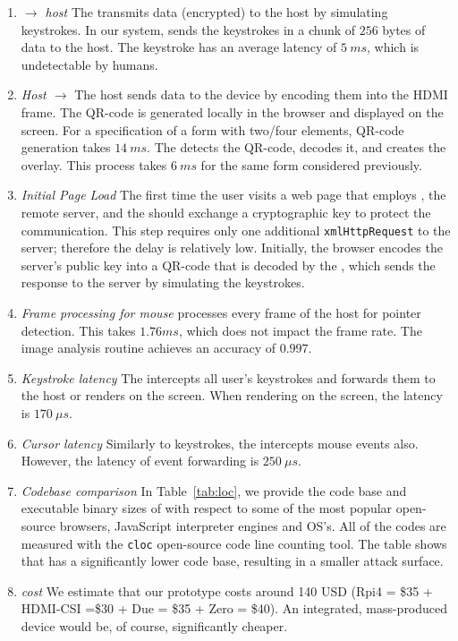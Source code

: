 \begin{enumerate}
  \item \emph{\device $\rightarrow$ host} The \device transmits data (encrypted) to the host by simulating keystrokes. In our system, \device sends the keystrokes in a chunk of $256$ bytes of data to the host. The keystroke has an average latency of $5\ ms$, which is undetectable by humans.  


\item \emph{Host $\rightarrow$ \device} The host sends data to the device by encoding them into the HDMI frame. The QR-code is generated locally in the browser and displayed on the screen. For a specification of a form with two/four elements, QR-code generation takes $14\ ms$. The \device detects the QR-code, decodes it, and creates the overlay. This process takes $6\ ms$ for the same form considered previously.
 
 \item \emph{Initial Page Load} The first time the user visits a web page that employs \name, the remote server, and the \device should exchange a cryptographic key to protect the communication. This step requires only one additional \texttt{xmlHttpRequest} to the server; therefore the delay is relatively low. Initially, the browser encodes the server's public key into a QR-code that is decoded by the \device, which sends the response to the server by simulating the keystrokes.


\item \emph{Frame processing for mouse} \device processes every frame of the host for pointer detection. This takes $1.76 ms$, which does not impact the frame rate. The image analysis routine achieves an accuracy of $0.997$. 


\item \emph{Keystroke latency} The \device intercepts all user's keystrokes and forwards them to the host or renders on the screen. When rendering on the screen, the latency is $170\ \mu s$.


\item \emph{Cursor latency} Similarly to keystrokes, the \device intercepts mouse events also. However, the latency of event forwarding is $250\ \mu s$.

\item \emph{Codebase comparison} In Table~\ref{tab:loc}, we provide the code base and executable binary sizes of \device with respect to some of the most popular open-source browsers, JavaScript interpreter engines and OS's. All of the codes are measured with the \texttt{cloc} open-source code line counting tool. The table shows that \name has a significantly lower code base, resulting in a smaller attack surface.


\item \emph{\device cost} We estimate that our \device prototype costs around 140 USD (Rpi4 = \$35 + HDMI-CSI =\$30 + Due = \$35 + Zero = \$40). An integrated, mass-produced device would be, of course, significantly cheaper.
  
\end{enumerate}



